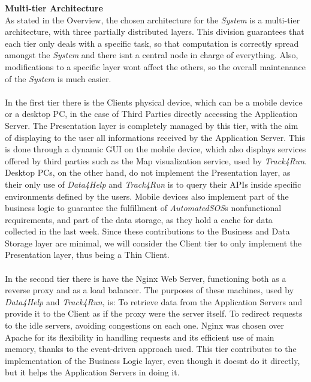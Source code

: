 \documentclass[titlepage]{article}
\begin{document}
	{\bf Multi-tier Architecture }\\ 
	As stated in the Overview, the chosen architecture for the {\it System} is a multi-tier architecture, with three partially distributed layers. This division guarantees that each tier only deals with a specific task, so that computation is correctly spread amongst the {\it System} and there isn\textsc{}t a central node in charge of everything. Also, modifications to a specific layer won\textsc{}t affect the others, so the overall maintenance of the {\it System} is much easier.\\ \\
	In the first tier there is the Client\textsc{}s physical device, which can be a mobile device or a desktop PC, in the case of Third Parties directly accessing the Application Server.
	The Presentation layer is completely managed by this tier, with the aim of displaying to the user all informations received by the Application Server. This is done through a dynamic GUI on the mobile device, which also displays services offered by third parties such as the Map visualization service, used by {\it Track4Run}. Desktop PCs, on the other hand, do not implement the Presentation layer, as their only use of {\it Data4Help} and {\it Track4Run} is to query their APIs inside specific environments defined by the users.
	Mobile devices also implement part of the business logic to guarantee the fulfillment of {\it AutomatedSOS}\textsc{}s nonfunctional requirements, and part of the data storage, as they hold a cache for data collected in the last week. Since these contributions to the Business and Data Storage layer are minimal, we will consider the Client tier to only implement the Presentation layer, thus being a Thin Client.\\ \\
	In the second tier there is have the Nginx Web Server, functioning both as a reverse proxy and as a load balancer. The purposes of these machines, used by {\it Data4Help} and {\it Track4Run}, is:
	To retrieve data from the Application Servers and provide it to the Client as if the proxy were the server itself.
	To redirect requests to the idle servers, avoiding congestions on each one.
	Nginx was chosen over Apache for its flexibility in handling requests and its efficient use of main memory, thanks to the event-driven approach used.
	This tier contributes to the implementation of the Business Logic layer, even though it doesn\textsc{}t do it directly, but it helps the Application Servers in doing it.\\ \\
\end{document}
